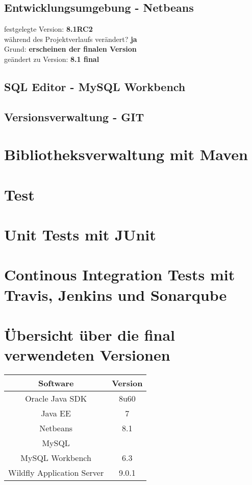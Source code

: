 \documentclass[12pt,a4paper]{scrreprt}
\begin{document}
\subsection{Entwicklungsumgebung - Netbeans}
festgelegte Version: \textbf{8.1RC2}\\
während des Projektverlaufs verändert? \textbf{ja}\\
Grund: \textbf{erscheinen der finalen Version} \\
geändert zu Version: \textbf{8.1 final}\\

\subsection{SQL Editor - MySQL Workbench}
\subsection{Versionsverwaltung - GIT}
\section{Bibliotheksverwaltung mit Maven}
\section{Test}
\section{Unit Tests mit JUnit}
\section{Continous Integration Tests mit Travis, Jenkins und Sonarqube}
\section{Übersicht über die final verwendeten Versionen}
\begin{center}
\begin{tabular}{|c|c|}
\hline
\rule[-1ex]{0pt}{2.5ex} Software & Version  \\ 
\hline 
\rule[-1ex]{0pt}{2.5ex} Oracle Java SDK & 8u60  \\ 
\hline 
\rule[-1ex]{0pt}{2.5ex} Java EE & 7 \\ 
\hline 
\rule[-1ex]{0pt}{2.5ex} Netbeans & 8.1 \\ 
\hline 
\rule[-1ex]{0pt}{2.5ex} MySQL &  \\ 
\hline 
\rule[-1ex]{0pt}{2.5ex} MySQL Workbench & 6.3 \\ 
\hline
\rule[-1ex]{0pt}{2.5ex} Wildfly Application Server & 9.0.1 \\ 
\hline 
\end{tabular}
\end{center}
\end{document}
